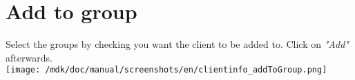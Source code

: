 \section{Add to group}Select the groups by checking you want the client to be added to. Click on \textit{"Add"} afterwards.\\
\texttt{[image: /mdk/doc/manual/screenshots/en/clientinfo\_addToGroup.png]} \\
